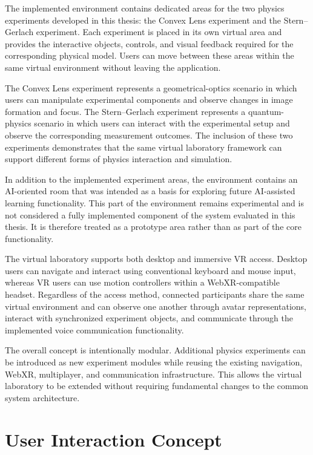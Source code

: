 The implemented environment contains dedicated areas for the two physics
experiments developed in this thesis: the Convex Lens experiment and the
Stern--Gerlach experiment. Each experiment is placed in its own virtual area
and provides the interactive objects, controls, and visual feedback required
for the corresponding physical model. Users can move between these areas
within the same virtual environment without leaving the application.

The Convex Lens experiment represents a geometrical-optics scenario in which
users can manipulate experimental components and observe changes in image
formation and focus. The Stern--Gerlach experiment represents a quantum-physics
scenario in which users can interact with the experimental setup and observe
the corresponding measurement outcomes. The inclusion of these two experiments
demonstrates that the same virtual laboratory framework can support different
forms of physics interaction and simulation.

In addition to the implemented experiment areas, the environment contains an
AI-oriented room that was intended as a basis for exploring future
AI-assisted learning functionality. This part of the environment remains
experimental and is not considered a fully implemented component of the
system evaluated in this thesis. It is therefore treated as a prototype area
rather than as part of the core functionality.

The virtual laboratory supports both desktop and immersive VR access. Desktop
users can navigate and interact using conventional keyboard and mouse input,
whereas VR users can use motion controllers within a WebXR-compatible headset.
Regardless of the access method, connected participants share the same virtual
environment and can observe one another through avatar representations,
interact with synchronized experiment objects, and communicate through the
implemented voice communication functionality.

The overall concept is intentionally modular. Additional physics experiments
can be introduced as new experiment modules while reusing the existing
navigation, WebXR, multiplayer, and communication infrastructure. This allows
the virtual laboratory to be extended without requiring fundamental changes
to the common system architecture.

\section{User Interaction Concept}

